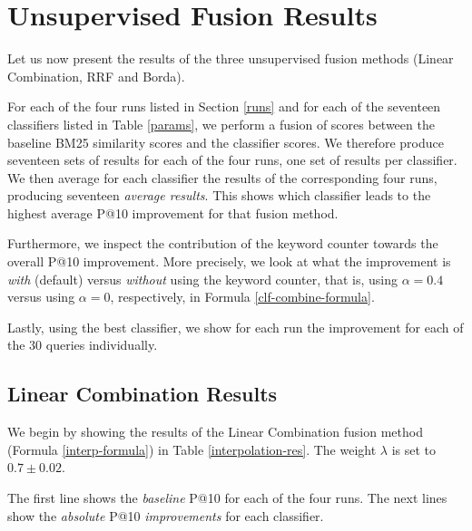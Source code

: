 \section{Unsupervised Fusion Results}
Let us now present the results of the three unsupervised fusion methods (Linear Combination, RRF and Borda).

For each of the four runs listed in Section \ref{runs} and for each of the seventeen classifiers listed in Table \ref{params}, we perform a fusion of scores
between the baseline BM25 similarity scores and the classifier scores.
We therefore produce seventeen sets of results for each of the four runs,
one set of results per classifier.
We then average for each classifier the results of the corresponding four runs, producing seventeen \emph{average results}.
This shows which classifier leads to the highest average P@10 improvement for that fusion method.

Furthermore, we inspect the contribution of the keyword counter towards the overall P@10 improvement. More precisely,
we look at what the improvement is \emph{with} (default) versus \emph{without} using the keyword counter, that is, using $\alpha=0.4$
versus using $\alpha=0$, respectively, in Formula \ref{clf-combine-formula}.

Lastly, using the best classifier, we show for each run the improvement for each of the 30 queries individually.

\subsection{Linear Combination Results}
We begin by showing the results of the Linear Combination fusion method (Formula \ref{interp-formula}) in Table \ref{interpolation-res}.
The weight $\lambda$ is set to $0.7\pm 0.02$.

The first line shows the \emph{baseline} P@10 for each of the four runs.
The next lines show the \emph{absolute} P@10 \emph{improvements} for each classifier.

